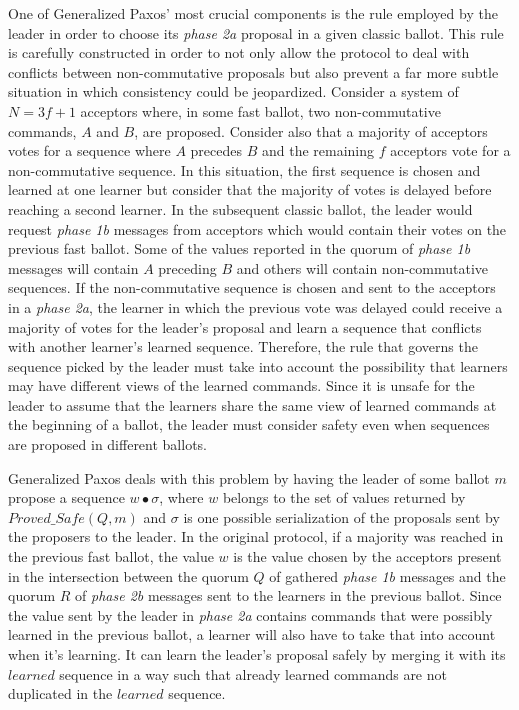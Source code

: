 One of Generalized Paxos' most crucial components is the rule employed by the leader in order to choose its \textit{phase 2a} proposal in a given classic ballot. This rule is carefully constructed in order to not only allow the protocol to deal with conflicts between non-commutative proposals but also prevent a far more subtle situation in which consistency could be jeopardized. Consider a system of $N=3f+1$ acceptors where, in some fast ballot, two non-commutative commands, $A$ and $B$, are proposed. Consider also that a majority of acceptors votes for a sequence where $A$ precedes $B$ and the remaining $f$ acceptors vote for a non-commutative sequence. In this situation, the first sequence is chosen and learned at one learner but consider that the majority of votes is delayed before reaching a second learner. In the subsequent classic ballot, the leader would request \textit{phase 1b} messages from acceptors which would contain their votes on the previous fast ballot. Some of the values reported in the quorum of \textit{phase 1b} messages will contain $A$ preceding $B$ and others will contain non-commutative sequences. If the non-commutative sequence is chosen and sent to the acceptors in a \textit{phase 2a}, the learner in which the previous vote was delayed could receive a majority of votes for the leader's proposal and learn a sequence that conflicts with another learner's learned sequence. Therefore, the rule that governs the sequence picked by the leader must take into account the possibility that learners may have different views of the learned commands. Since it is unsafe for the leader to assume that the learners share the same view of learned commands at the beginning of a ballot, the leader must consider safety even when sequences are proposed in different ballots. \par
Generalized Paxos deals with this problem by having the leader of some ballot $m$ propose a sequence $w \bullet \sigma$, where $w$ belongs to the set of values returned by $Proved\_Safe(Q,m)$ and $\sigma$ is one possible serialization of the proposals sent by the proposers to the leader. In the original protocol, if a majority was reached in the previous fast ballot, the value $w$ is the value chosen by the acceptors present in the intersection between the quorum $Q$ of gathered \textit{phase 1b} messages and the quorum $R$ of \textit{phase 2b} messages sent to the learners in the previous ballot. Since the value sent by the leader in \textit{phase 2a} contains commands that were possibly learned in the previous ballot, a learner will also have to take that into account when it's learning. It can learn the leader's proposal safely by merging it with its $learned$ sequence in a way such that already learned commands are not duplicated in the $learned$ sequence. \par

